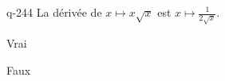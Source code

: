\begin{truefalse}{q-244}
La dérivée de $x\mapsto x\sqrt{x}$ est $x\mapsto \frac{1}{2\sqrt{x}}$.
\item Vrai
\item* Faux
\end{truefalse}

